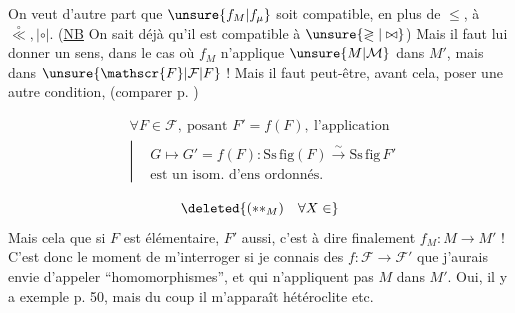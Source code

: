 On veut d'autre part que $\unsure{f_M|f_\mu}$ soit compatible, en plus de $\leq$, à $\overset{\circ}{\ll},\mathrel{|\circ|}$. (\uline{NB} On sait déjà qu'il est compatible à $\unsure{\gtrless|\bowtie}$) Mais il faut lui donner un sens, dans le cas où  $f_M$ n'applique  $\unsure{M|\mathcal{M}}$ dans $M'$, mais dans $\unsure{\mathscr{F}|\mathcal{F}|F}$ ! Mais il faut peut-être, avant cela, poser une autre condition, (comparer p. )

\[
\begin{aligned}
&\forall F\in\mathscr{F},\ \text{posant }F'=f(F),\ \text{l'application}\\
&\left|\begin{aligned}&G\longmapsto G'=f(F):\mathrm{Ss\,fig}(F)\overset{\sim}{\longrightarrow}\mathrm{Ss\,fig}\,F'\\
&\text{est un isom. d'ens ordonnés.}
\end{aligned}\right.\end{aligned}\tag*{(**)}
\]

\[
\deleted{(**_M)\quad\forall X\in}
\]
Mais cela  que si $F$ est élémentaire, $F'$ aussi, c'est à dire finalement $f_M:M\longrightarrow M'$ ! C'est donc le moment de m'interroger si je connais des  $f:\mathscr{F}\longrightarrow\mathscr{F}'$ que j'aurais envie d'appeler ``homomorphismes'', et qui n'appliquent pas $M$ dans $M'$. Oui, il y a exemple  p. 50, mais du coup il m'apparaît hétéroclite etc.
